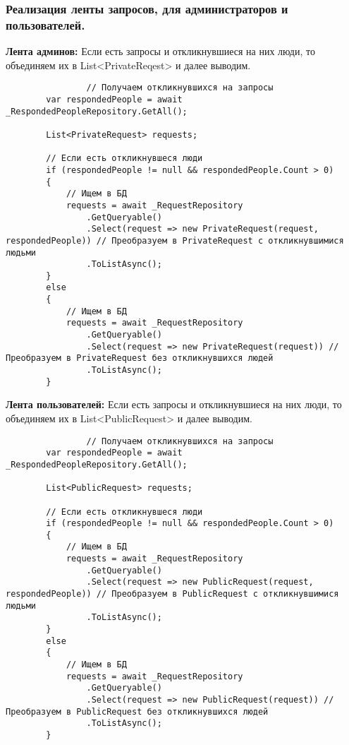 \subsubsection{Реализация ленты запросов, для администраторов и пользователей.}

\textbf{Лента админов:} Если есть запросы и откликнувшиеся на них люди, то объединяем их в List<PrivateReqest> и далее выводим.
\begin{verbatim}
				// Получаем откликнувшихся на запросы
        var respondedPeople = await _RespondedPeopleRepository.GetAll();

        List<PrivateRequest> requests;

        // Если есть откликнувшеся люди
        if (respondedPeople != null && respondedPeople.Count > 0)
        {
            // Ищем в БД
            requests = await _RequestRepository
                .GetQueryable()
                .Select(request => new PrivateRequest(request, respondedPeople)) // Преобразуем в PrivateRequest с откликнувшимися людьми
                .ToListAsync();
        }
        else
        {
            // Ищем в БД
            requests = await _RequestRepository
                .GetQueryable()
                .Select(request => new PrivateRequest(request)) // Преобразуем в PrivateRequest без откликнувшихся людей
                .ToListAsync();
        }
\end{verbatim}

\textbf{Лента пользователей:}  Если есть запросы и откликнувшиеся на них люди, то объединяем их в List<PublicRequest> и далее выводим.
\begin{verbatim}
				// Получаем откликнувшихся на запросы
        var respondedPeople = await _RespondedPeopleRepository.GetAll();

        List<PublicRequest> requests;

        // Если есть откликнувшеся люди
        if (respondedPeople != null && respondedPeople.Count > 0)
        {
            // Ищем в БД
            requests = await _RequestRepository
                .GetQueryable()
                .Select(request => new PublicRequest(request, respondedPeople)) // Преобразуем в PublicRequest с откликнувшимися людьми
                .ToListAsync();
        }
        else
        {
            // Ищем в БД
            requests = await _RequestRepository
                .GetQueryable()
                .Select(request => new PublicRequest(request)) // Преобразуем в PublicRequest без откликнувшихся людей
                .ToListAsync();
        }
\end{verbatim}

